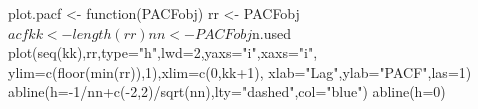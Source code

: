 \begin{Schunk}
\begin{Sinput}
 plot.pacf <- function(PACFobj) {
   rr <- PACFobj$acf
   kk <- length(rr)
   nn <- PACFobj$n.used
   plot(seq(kk),rr,type="h",lwd=2,yaxs="i",xaxs="i",
        ylim=c(floor(min(rr)),1),xlim=c(0,kk+1),
        xlab="Lag",ylab="PACF",las=1)
   abline(h=-1/nn+c(-2,2)/sqrt(nn),lty="dashed",col="blue")
   abline(h=0)
 }                                                                                                            
\end{Sinput}
\end{Schunk}
